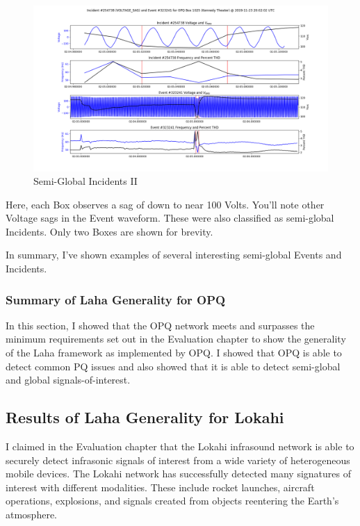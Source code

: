 \begin{figure}[H]
    \centering
    \includegraphics[width=\linewidth]{figures/vsag_g_2.png}
    \caption{Semi-Global Incidents II}
    \label{fig:i_2}
\end{figure}

Here, each Box observes a sag of down to near 100 Volts. You'll note other Voltage sags in the Event waveform. These were also classified as semi-global Incidents. Only two Boxes are shown for brevity.

In summary, I've shown examples of several interesting semi-global Events and Incidents.

\subsubsection{Summary of Laha Generality for OPQ}

In this section, I showed that the OPQ network meets and surpasses the minimum requirements set out in the Evaluation chapter to show the generality of the Laha framework as implemented by OPQ. I showed that OPQ is able to detect common PQ issues and also showed that it is able to detect semi-global and global signals-of-interest.

\subsection{Results of Laha Generality for Lokahi}\label{subsec:results-of-laha-generality-for-lokahi}

I claimed in the Evaluation chapter that the Lokahi infrasound network is able to securely detect infrasonic signals of interest from a wide variety of heterogeneous mobile devices. The Lokahi network has successfully detected many signatures of interest with different modalities. These include rocket launches, aircraft operations, explosions, and signals created from objects reentering the Earth's atmosphere.

